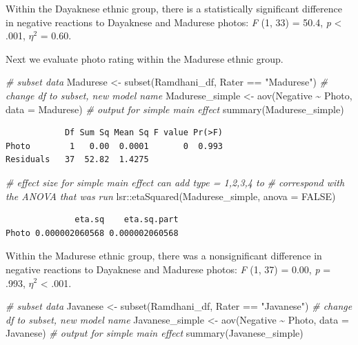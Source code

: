 \documentclass[
  11pt,
]{book}
\newenvironment{Shaded}{\begin{snugshade}}{\end{snugshade}}
\newcommand{\AttributeTok}[1]{\textcolor[rgb]{0.77,0.63,0.00}{#1}}
\newcommand{\CommentTok}[1]{\textcolor[rgb]{0.56,0.35,0.01}{\textit{#1}}}
\newcommand{\ConstantTok}[1]{\textcolor[rgb]{0.00,0.00,0.00}{#1}}
\newcommand{\FunctionTok}[1]{\textcolor[rgb]{0.00,0.00,0.00}{#1}}
\newcommand{\NormalTok}[1]{#1}
\newcommand{\OtherTok}[1]{\textcolor[rgb]{0.56,0.35,0.01}{#1}}
\newcommand{\SpecialCharTok}[1]{\textcolor[rgb]{0.00,0.00,0.00}{#1}}
\newcommand{\StringTok}[1]{\textcolor[rgb]{0.31,0.60,0.02}{#1}}
\begin{document}
Within the Dayaknese ethnic group, there is a statistically significant difference in negative reactions to Dayaknese and Madurese photos: \emph{F} (1, 33) = 50.4, \emph{p} \textless{} .001, \(\eta ^{2}\) = 0.60.

Next we evaluate photo rating within the Madurese ethnic group.

\begin{Shaded}
\begin{Highlighting}[]
\CommentTok{\# subset data}
\NormalTok{Madurese }\OtherTok{\textless{}{-}} \FunctionTok{subset}\NormalTok{(Ramdhani\_df, Rater }\SpecialCharTok{==} \StringTok{"Madurese"}\NormalTok{)}
\CommentTok{\# change df to subset, new model name}
\NormalTok{Madurese\_simple }\OtherTok{\textless{}{-}} \FunctionTok{aov}\NormalTok{(Negative }\SpecialCharTok{\textasciitilde{}}\NormalTok{ Photo, }\AttributeTok{data =}\NormalTok{ Madurese)}
\CommentTok{\# output for simple main effect}
\FunctionTok{summary}\NormalTok{(Madurese\_simple)}
\end{Highlighting}
\end{Shaded}

\begin{verbatim}
            Df Sum Sq Mean Sq F value Pr(>F)
Photo        1   0.00  0.0001       0  0.993
Residuals   37  52.82  1.4275               
\end{verbatim}

\begin{Shaded}
\begin{Highlighting}[]
\CommentTok{\# effect size for simple main effect can add \textquotesingle{}type = 1,2,3,4\textquotesingle{} to}
\CommentTok{\# correspond with the ANOVA that was run}
\NormalTok{lsr}\SpecialCharTok{::}\FunctionTok{etaSquared}\NormalTok{(Madurese\_simple, }\AttributeTok{anova =} \ConstantTok{FALSE}\NormalTok{)}
\end{Highlighting}
\end{Shaded}

\begin{verbatim}
              eta.sq    eta.sq.part
Photo 0.000002060568 0.000002060568
\end{verbatim}

Within the Madurese ethnic group, there was a nonsignificant difference in negative reactions to Dayaknese and Madurese photos: \emph{F} (1, 37) = 0.00, \emph{p} = .993, \(\eta ^{2}\) \textless{} .001.

\begin{Shaded}
\begin{Highlighting}[]
\CommentTok{\# subset data}
\NormalTok{Javanese }\OtherTok{\textless{}{-}} \FunctionTok{subset}\NormalTok{(Ramdhani\_df, Rater }\SpecialCharTok{==} \StringTok{"Javanese"}\NormalTok{)}
\CommentTok{\# change df to subset, new model name}
\NormalTok{Javanese\_simple }\OtherTok{\textless{}{-}} \FunctionTok{aov}\NormalTok{(Negative }\SpecialCharTok{\textasciitilde{}}\NormalTok{ Photo, }\AttributeTok{data =}\NormalTok{ Javanese)}
\CommentTok{\# output for simple main effect}
\FunctionTok{summary}\NormalTok{(Javanese\_simple)}
\end{Highlighting}
\end{Shaded}
\end{document}

